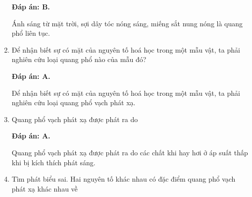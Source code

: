 \begin{enumerate}[label=\bfseries Câu \arabic*:]
	\loigiai
	{		\textbf{Đáp án: B.}
		
Ánh sáng từ mặt trời, sợi dây tóc nóng sáng, miếng sắt nung nóng là quang phổ liên tục.
		
	}
	
	\item {} 
	
	\cauhoi
	{Để nhận biết sự có mặt của nguyên tố hoá học trong một mẫu vật, ta phải nghiên cứu loại quang phổ nào của mẫu đó?
	}
	
	\loigiai
	{		\textbf{Đáp án: A.}
		
Để nhận biết sự có mặt của nguyên tố hoá học trong một mẫu vật, ta phải nghiên cứu loại quang phổ vạch phát xạ.
		
	}
	
	\item {} 
	
	\cauhoi
	{Quang phổ vạch phát xạ được phát ra do
	}
	
	\loigiai
	{		\textbf{Đáp án: A.}
		
Quang phổ vạch phát xạ được phát ra do các chất khi hay hơi ở áp suất thấp khi bị kích thích phát sáng. 
		
	}
	
	\item {} 
	
	\cauhoi
	{Tìm phát biểu sai. Hai nguyên tố khác nhau có đặc điểm quang phổ vạch phát xạ khác nhau về
	}
	

\end{enumerate}
